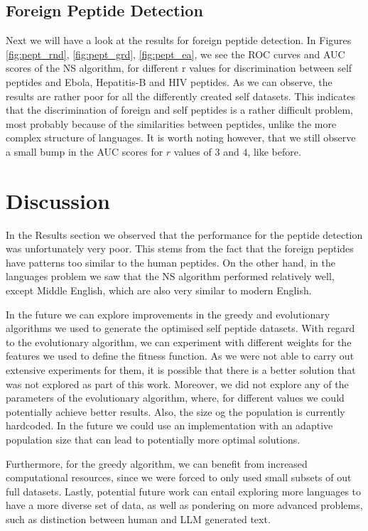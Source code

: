 \documentclass{article}
\begin{document}
\subsection{Foreign Peptide Detection}
Next we will have a look at the results for foreign peptide detection. In Figures \ref{fig:pept_rnd}, \ref{fig:pept_grd}, 
\ref{fig:pept_ea},  we see the ROC curves and AUC scores of the NS algorithm, for different r values for discrimination 
between self peptides and Ebola, Hepatitis-B and HIV peptides. As we can observe, the results are rather poor for all 
the differently created self datasets. This indicates that the discrimination of foreign and self peptides is a rather 
difficult problem, most probably because of the similarities between peptides, unlike the more complex structure of 
languages. It is worth noting however, that we still observe a small bump in the AUC scores for $r$ values of $3$ and 
$4$, like before.

\section{Discussion}
In the Results section we observed that the performance for the peptide detection was unfortunately very poor. This stems
from the fact that the foreign peptides have patterns too similar to the human peptides. On the other hand, in the 
languages problem we saw that the NS algorithm performed relatively well, except Middle English, which are also very 
similar to modern English. 

In the future we can explore improvements in the greedy and evolutionary algorithms we used to generate the optimised 
self peptide datasets. With regard to the evolutionary algorithm, we can experiment with different weights for the
features we used to define the fitness function. As we were not able to carry out extensive experiments for them, it is 
possible that there is a better solution that was not explored as part of this work. Moreover, we did not explore any
of the parameters of the evolutionary algorithm, where, for different values we could potentially achieve better
results. Also, the size og the population is currently hardcoded. In the future we could use an implementation with an
adaptive population size that can lead to potentially more optimal solutions.

Furthermore, for the greedy algorithm, we can benefit from increased computational resources, since we were 
forced to only used small subsets of out full datasets. Lastly, potential future work can entail exploring more languages to have a more diverse set of data, as well as pondering 
on more advanced problems, such as distinction between human and LLM generated text.
\end{document}
